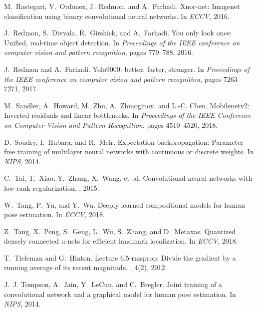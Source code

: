 \documentclass[10pt,twocolumn,letterpaper]{article}
\begin{document}
{\begin{thebibliography}{10}
M.~Rastegari, V.~Ordonez, J.~Redmon, and A.~Farhadi.
\newblock Xnor-net: Imagenet classification using binary convolutional neural
  networks.
\newblock In {\em ECCV}, 2016.

J.~Redmon, S.~Divvala, R.~Girshick, and A.~Farhadi.
\newblock You only look once: Unified, real-time object detection.
\newblock In {\em Proceedings of the IEEE conference on computer vision and
  pattern recognition}, pages 779--788, 2016.

J.~Redmon and A.~Farhadi.
\newblock Yolo9000: better, faster, stronger.
\newblock In {\em Proceedings of the IEEE conference on computer vision and
  pattern recognition}, pages 7263--7271, 2017.

M.~Sandler, A.~Howard, M.~Zhu, A.~Zhmoginov, and L.-C. Chen.
\newblock Mobilenetv2: Inverted residuals and linear bottlenecks.
\newblock In {\em Proceedings of the IEEE Conference on Computer Vision and
  Pattern Recognition}, pages 4510--4520, 2018.

D.~Soudry, I.~Hubara, and R.~Meir.
\newblock Expectation backpropagation: Parameter-free training of multilayer
  neural networks with continuous or discrete weights.
\newblock In {\em NIPS}, 2014.

C.~Tai, T.~Xiao, Y.~Zhang, X.~Wang, et~al.
\newblock Convolutional neural networks with low-rank regularization.
, 2015.

W.~Tang, P.~Yu, and Y.~Wu.
\newblock Deeply learned compositional models for human pose estimation.
\newblock In {\em ECCV}, 2018.

Z.~Tang, X.~Peng, S.~Geng, L.~Wu, S.~Zhang, and D.~Metaxas.
\newblock Quantized densely connected u-nets for efficient landmark
  localization.
\newblock In {\em ECCV}, 2018.

T.~Tieleman and G.~Hinton.
\newblock Lecture 6.5-rmsprop: Divide the gradient by a running average of its
  recent magnitude.
, 4(2), 2012.

J.~J. Tompson, A.~Jain, Y.~LeCun, and C.~Bregler.
\newblock Joint training of a convolutional network and a graphical model for
  human pose estimation.
\newblock In {\em NIPS}, 2014.


\end{thebibliography}}
\end{document}
